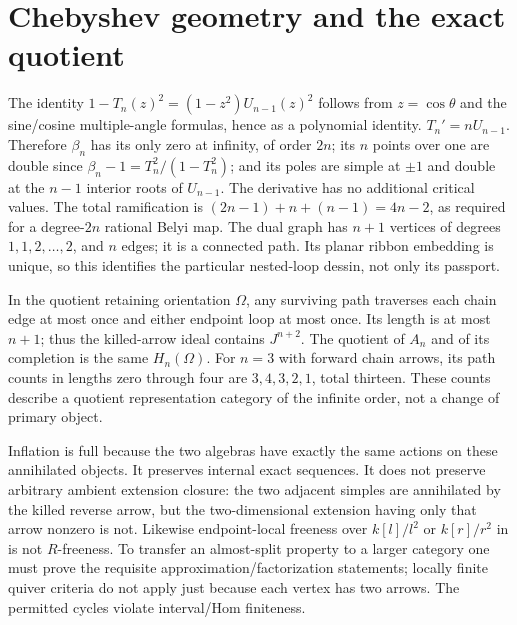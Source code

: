 \section{Chebyshev geometry and the exact quotient}
The identity $1-T_n(z)^2=(1-z^2)U_{n-1}(z)^2$ follows from $z=\cos\theta$ and the sine/cosine multiple-angle formulas, hence as a polynomial identity. $T_n'=nU_{n-1}$. Therefore $\beta_n$ has its only zero at infinity, of order $2n$; its $n$ points over one are double since $\beta_n-1=T_n^2/(1-T_n^2)$; and its poles are simple at $\pm1$ and double at the $n-1$ interior roots of $U_{n-1}$. The derivative has no additional critical values. The total ramification is $(2n-1)+n+(n-1)=4n-2$, as required for a degree-$2n$ rational Belyi map. The dual graph has $n+1$ vertices of degrees $1,1,2,\ldots,2$, and $n$ edges; it is a connected path. Its planar ribbon embedding is unique, so this identifies the particular nested-loop dessin, not only its passport.

In the quotient retaining orientation $\Omega$, any surviving path traverses each chain edge at most once and either endpoint loop at most once. Its length is at most $n+1$; thus the killed-arrow ideal contains $J^{n+2}$. The quotient of $A_n$ and of its completion is the same $H_n(\Omega)$. For $n=3$ with forward chain arrows, its path counts in lengths zero through four are $3,4,3,2,1$, total thirteen. These counts describe a quotient representation category of the infinite order, not a change of primary object.

Inflation is full because the two algebras have exactly the same actions on these annihilated objects. It preserves internal exact sequences. It does not preserve arbitrary ambient extension closure: the two adjacent simples are annihilated by the killed reverse arrow, but the two-dimensional extension having only that arrow nonzero is not. Likewise endpoint-local freeness over $k[l]/l^2$ or $k[r]/r^2$ in \cite{HuangLinSu} is not $R$-freeness. To transfer an almost-split property to a larger category one must prove the requisite approximation/factorization statements; locally finite quiver criteria \cite{BautistaLiuPaquette,Paquette,LiuNgPaquette} do not apply just because each vertex has two arrows. The permitted cycles violate interval/Hom finiteness.

